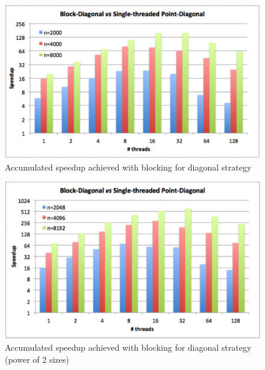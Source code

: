 \documentclass[../thesis]{subfiles}
\begin{document}
	\begin{figure}[p]
			\centering
			\includegraphics[height=0.25\textheight]{assets/images/multicore/diagonal-block-stpoint-speedup.png}
			\caption{Accumulated speedup achieved with blocking for diagonal strategy}
			\label{fig:multicore:block:diagonal:speedup:accumulated}
	\end{figure}
	
	\begin{figure}[p]
		\centering
		\includegraphics[height=0.25\textheight]{assets/images/multicore/diagonal-block-stpoint-speedup-strange.png}
		\captionsetup{font=small}
		\caption{Accumulated speedup achieved with blocking for diagonal strategy (power of 2 sizes)}
		\label{fig:multicore:block:diagonal:speedup:accumulated:strange}
	\end{figure}
\end{document}
